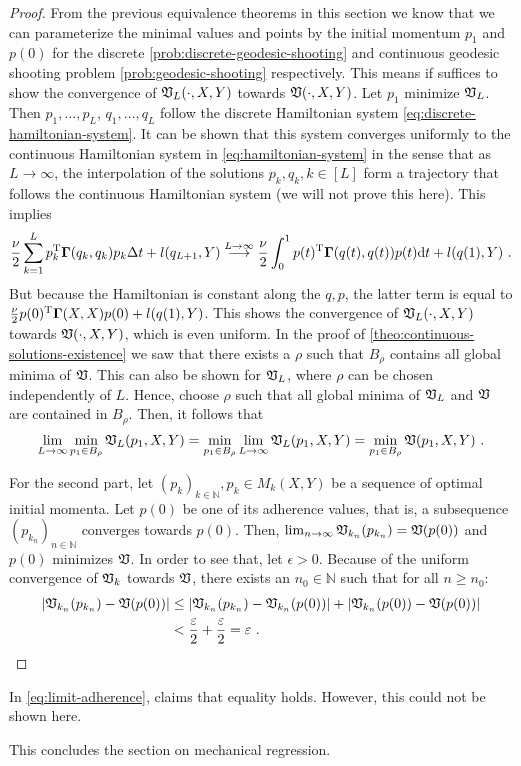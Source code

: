 \begin{proof}
	From the previous equivalence theorems in this section we know that we can parameterize the minimal values and points by the initial momentum $p_1$ and $p(0)$ for the discrete \ref{prob:discrete-geodesic-shooting} and continuous geodesic shooting problem \ref{prob:geodesic-shooting} respectively.
	This means if suffices to show the convergence of $\mathfrak{V}_L(\cdot, X, Y)$ towards $\mathfrak{V}(\cdot, X, Y)$.
	Let $p_1$ minimize $\mathfrak{V}_L$.
	Then $p_1, \ldots, p_L$, $q_1, \ldots, q_L$ follow the discrete Hamiltonian system \ref{eq:discrete-hamiltonian-system}.
	It can be shown that this system converges uniformly to the continuous Hamiltonian system in \cref{eq:hamiltonian-system} in the sense that as $L \rightarrow \infty$, the interpolation of the solutions $p_k, q_k, k \in [L]$ form a trajectory that follows the continuous Hamiltonian system (we will not prove this here).
	This implies
	\begin{equation}
		\frac{\nu}{2} \sum_{k=1}^L p_k^{\mathrm{T}} \mathbf{\Gamma}(q_k, q_k) p_k \Delta t + l(q_{L+1}, Y) 
		\stackrel{L \rightarrow \infty}{\longrightarrow} \frac{\nu}{2} \int_{0}^{1} p(t)^{\mathrm{T}} \mathbf{\Gamma}(q(t), q(t)) p(t) \mathrm{d} t + l(q(1), Y) \ . 
	\end{equation}
	But because the Hamiltonian is constant along the $q, p$, the latter term is equal to $\frac{\nu}{2} p(0)^{\mathrm{T}} \mathbf{\Gamma}(X, X) p(0) + l(q(1), Y)$.
	This shows the convergence of $\mathfrak{V}_L(\cdot, X, Y)$ towards $\mathfrak{V}(\cdot, X, Y)$, which is even uniform.
	In the proof of \cref{theo:continuous-solutions-existence} we saw that there exists a $\rho$ such that $B_\rho$ contains all global minima of $\mathfrak{V}$.
	This can also be shown for $\mathfrak{V}_L$, where $\rho$ can be chosen independently of $L$.
	Hence, choose $\rho$ such that all global minima of $\mathfrak{V}_L$ and $\mathfrak{V}$ are contained in $B_\rho$.
	Then, it follows that
	\begin{equation}
		\lim_{L \rightarrow \infty} \min_{p_1 \in B_\rho} \mathfrak{V}_L(p_1, X, Y) = \min_{p_1 \in B_\rho} \lim_{L \rightarrow \infty}  \mathfrak{V}_L(p_1, X, Y) = \min_{p_1 \in B_\rho} \mathfrak{V}(p_1, X, Y) \ .
	\end{equation}

	For the second part, let $(p_k)_{k \in \mathbb{N}}, p_k \in M_k(X, Y)$ be a sequence of optimal initial momenta.
	Let $p(0)$ be one of its adherence values, that is, a subsequence $(p_{k_n})_{n \in \mathbb{N}}$ converges towards $p(0)$.
	Then, $\lim_{n\rightarrow \infty} \mathfrak{V}_{k_n}(p_{k_n}) = \mathfrak{V}(p(0))$ and $p(0)$ minimizes $\mathfrak{V}$.
	In order to see that, let $\epsilon > 0$. 
	Because of the uniform convergence of $\mathfrak{V}_k$ towards $\mathfrak{V}$, there exists an $n_0 \in \mathbb{N}$ such that for all $n \geq n_0$:
	\begin{align}
		\abs{\mathfrak{V}_{k_n}(p_{k_n}) - \mathfrak{V}(p(0))} 
		&\leq \abs{\mathfrak{V}_{k_n}(p_{k_n}) - \mathfrak{V}_{k_n}(p(0))} + \abs{\mathfrak{V}_{k_n}(p(0)) - \mathfrak{V}(p(0))}\\
		&< \frac{\varepsilon}{2} + \frac{\varepsilon}{2} = \varepsilon \ .
	\end{align}
\end{proof}

In \cref{eq:limit-adherence}, \citet{owhadi20} claims that equality holds.
However, this could not be shown here.

This concludes the section on mechanical regression.
